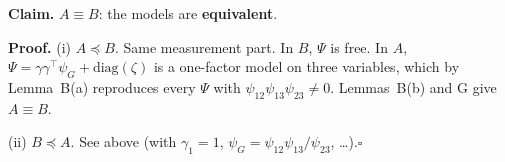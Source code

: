 \documentclass[10pt,a4paper]{article}
\newcommand{\nest}{\preceq}
\begin{document}
\par\bigskip
\noindent\textbf{Claim.} $A \equiv B$: the models are \textbf{equivalent}.\par\smallskip
\noindent\textbf{Proof.} (i) $A\nest B$. Same measurement part. In $B$, $\Psi$ is free. In $A$, $\Psi=\gamma\gamma^\top\psi_G+\mathrm{diag}(\zeta)$ is a one-factor model on three variables, which by Lemma~B(a) reproduces every $\Psi$ with $\psi_{12}\psi_{13}\psi_{23}\neq0$. Lemmas~B(b) and G give $A\equiv B$.\par\smallskip
\noindent(ii) $B\nest A$. See above (with $\gamma_1=1$, $\psi_G=\psi_{12}\psi_{13}/\psi_{23}$, \dots).\hfill$\square$\par\medskip
{}

\clearpage
\end{document}
